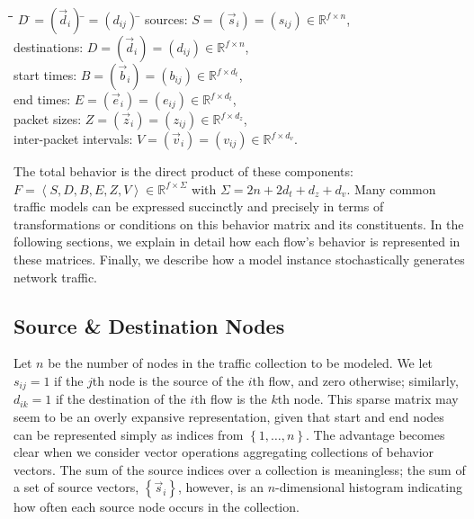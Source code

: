 \documentclass[conference]{IEEEtran}
\newcommand{\R}{\mathbb{R}}
\newcommand{\set}[1]{\left\{#1\right\}}
\newcommand{\parensx}[1]{(#1)}
\newcommand{\seq}[1]{\left<#1\right>}
\renewcommand{\bullet}{\raisebox{2pt}{$\centerdot$}}
\begin{document}
\begin{tabbing}
\hspace{1.5em}\=\bullet\hspace{0.5em}\=\hspace{9.75em}\=
$D\:$\=$=\parensx{\vec{d}_i}\:$\=$=\parensx{d_{ij}}\:$\=\kill
\>\bullet\> sources: \>$S$\>$=\parensx{\vec{s}_i}$\>$=\parensx{s_{ij}}$\>$\in\R^{f \times n}$,\\
\>\bullet\> destinations: \>$D$\>$=\parensx{\vec{d}_i}$\>$=\parensx{d_{ij}}$\>$\in\R^{f \times n}$,\\
\>\bullet\> start times: \>$B$\>$=\parensx{\vec{b}_i}$\>$=\parensx{b_{ij}}$\>$\in\R^{f \times d_t}$,\\
\>\bullet\> end times: \>$E$\>$=\parensx{\vec{e}_i}$\>$=\parensx{e_{ij}}$\>$\in\R^{f \times d_t}$,\\
\>\bullet\> packet sizes: \>$Z$\>$=\parensx{\vec{z}_i}$\>$=\parensx{z_{ij}}$\>$\in\R^{f \times d_z}$,\\
\>\bullet\> inter-packet intervals: \>$V$\>$=\parensx{\vec{v}_i}$\>$=\parensx{v_{ij}}$\>$\in\R^{f \times d_v}$.
\end{tabbing}
The total behavior is the direct product of these components: $F = \seq{S,D,B,E,Z,V} \in \R^{f \times \Sigma}$ with $\Sigma=2n+2d_t+d_z+d_v$. Many common traffic models can be expressed succinctly and precisely in terms of transformations or conditions on this behavior matrix and its constituents. In the following sections, we explain in detail how each flow's behavior is represented in these matrices. Finally, we describe how a model instance stochastically generates network traffic.

\subsection{Source \& Destination Nodes}

Let $n$ be the number of nodes in the traffic collection to be modeled. We let $s_{ij}=1$ if the $j$th node is the source of the $i$th flow, and zero otherwise; similarly, $d_{ik}=1$ if the destination of the $i$th flow is the $k$th node. This sparse matrix may seem to be an overly expansive representation, given that start and end nodes can be represented simply as indices from $\set{1,\dots,n}$. The advantage becomes clear when we consider vector operations aggregating collections of behavior vectors. The sum of the source indices over a collection is meaningless; the sum of a set of source vectors, $\set{\vec{s}_i}$, however, is an $n$-dimensional histogram indicating how often each source node occurs in the collection.
\end{document}
